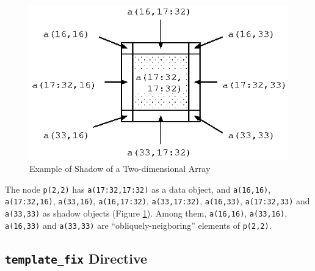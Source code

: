 \begin{minipage}{0.5\hsize}
\begin{center}
\end{center}
\end{minipage}
%
\hspace{0.5cm}
%
\begin{minipage}{0.4\hsize}
\begin{figure}[H]
\begin{center}
\includegraphics[width=\hsize]{figs/fig3.1.eps}
\end{center}
\caption{Example of Shadow of a Two-dimensional Array}
\label{fig3.1}
\end{figure}
\end{minipage}

\vspace{0.5cm}

The node {\tt p(2,2)} has {\tt a(17:32,17:32)} as a data object, and
{\tt a(16,16)}, {\tt a(17:32,16)}, {\tt a(33,16)}, {\tt a(16,17:32)},
{\tt a(33,17:32)}, {\tt a(16,33)}, {\tt a(17:32,33)} and {\tt a(33,33)}
as shadow objects (Figure \ref{fig3.1}). Among them, {\tt a(16,16)},
{\tt a(33,16)}, {\tt a(16,33)} and {\tt a(33,33)} are
``obliquely-neigboring'' elements of {\tt p(2,2)}.


\subsection{{\tt template\_fix} Directive}
\label{subsec:template_fix directive}

